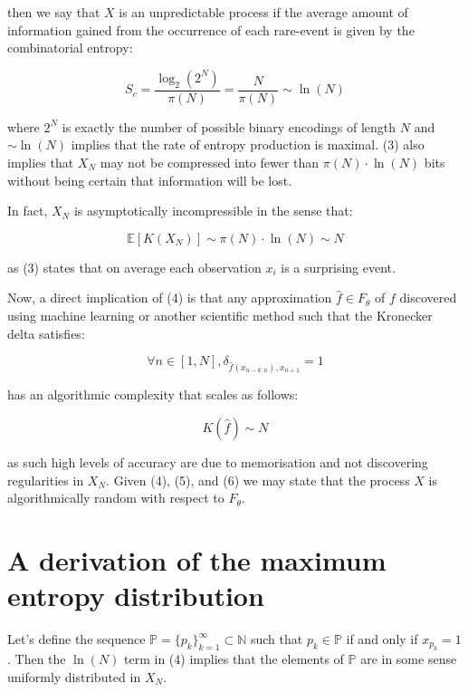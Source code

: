 \documentclass{article}
\begin{document}
then we say that $X$ is an unpredictable process if the average amount of information gained from the occurrence of each rare-event is given by the combinatorial entropy: 

\begin{equation}
S_c = \frac{\log_2 (2^N)}{\pi(N)} = \frac{N}{\pi(N)} \sim \ln(N)
\end{equation}

where $2^N$ is exactly the number of possible binary encodings of length $N$ and 
$\sim \ln(N)$ implies that the rate of entropy production is maximal. (3) also implies that $X_N$ may not be compressed into fewer than $\pi(N) \cdot \ln(N)$ bits without being certain that information will be lost. 

\newpage

In fact, $X_N$ is asymptotically incompressible in the sense that: 

\begin{equation}
\mathbb{E}[K(X_N)] \sim 	\pi(N) \cdot \ln(N) \sim N
\end{equation}

as (3) states that on average each observation $x_i$ is a surprising event.  

Now, a direct implication of (4) is that any approximation $\hat{f} \in F_{\theta}$ of $f$ discovered using machine learning or another scientific 
method such that the Kronecker delta satisfies: 

\begin{equation}
\forall n \in [1,N], \delta_{\hat{f}(x_{n-k:n}),x_{n+1}} = 1	
\end{equation}

has an algorithmic complexity that scales as follows: 

\begin{equation}
K(\hat{f}) \sim N	
\end{equation}

as such high levels of accuracy are due to memorisation and not discovering 
regularities in $X_N$. Given (4), (5), and (6) we may state that the process $X$ is algorithmically 
random with respect to $F_{\theta}$. 

\section{A derivation of the maximum entropy distribution}

Let's define the sequence $\mathbb{P} = \{p_k\}_{k=1}^\infty \subset \mathbb{N}$
such that $p_k \in \mathbb{P}$ if and only if $x_{p_k} = 1$. Then the $\ln(N)$ term in 
(4) implies that the elements of $\mathbb{P}$ are in some sense uniformly distributed in $X_N$. 
\end{document}
